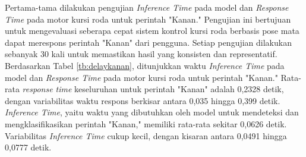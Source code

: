 Pertama-tama dilakukan pengujian \emph{Inference Time} pada model dan \emph{Response Time} pada motor kursi roda untuk perintah "Kanan." Pengujian ini bertujuan untuk mengevaluasi seberapa cepat sistem kontrol kursi roda berbasis pose mata dapat merespons perintah "Kanan" dari pengguna. Setiap pengujian dilakukan sebanyak 30 kali untuk memastikan hasil yang konsisten dan representatif. Berdasarkan Tabel \ref{tb:delaykanan}, ditunjukkan waktu \emph{Inference Time} pada model dan \emph{Response Time} pada motor kursi roda untuk perintah "Kanan." Rata-rata \emph{response time} keseluruhan untuk perintah "Kanan" adalah 0,2328 detik, dengan variabilitas waktu respons berkisar antara 0,035 hingga 0,399 detik. \emph{Inference Time}, yaitu waktu yang dibutuhkan oleh model untuk mendeteksi dan mengklasifikasikan perintah "Kanan," memiliki rata-rata sekitar 0,0626 detik. Variabilitas \emph{Inference Time} cukup kecil, dengan kisaran antara 0,0491 hingga 0,0777 detik.

